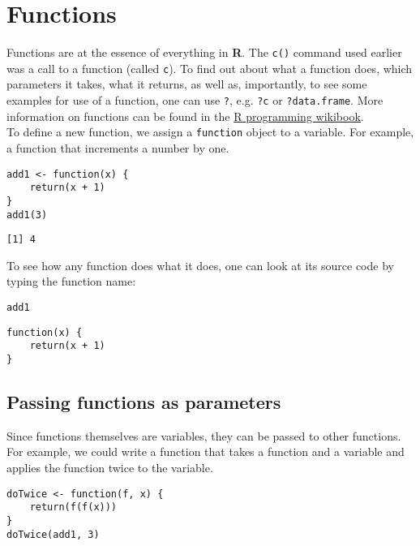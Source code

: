 \documentclass[11pt,a4paper]{article}
\begin{document}
\section{Functions}
\label{sec-3}
Functions are at the essence of everything in \textbf{R}. The \verb~c()~ command used earlier was a call to a function (called \verb~c~). To find out about what a function does, which parameters it takes, what it returns, as well as, importantly, to see some examples for use of a function, one can use \verb~?~, e.g. \verb~?c~ or \verb~?data.frame~. More information on functions can be found in the \href{http://en.wikibooks.org/wiki/R_Programming/Working_with_functions}{R programming wikibook}. \\

To define a new function, we assign a \verb~function~ object to a variable. For example, a function that increments a number by one. \\

\begin{verbatim}
add1 <- function(x) {
    return(x + 1)
}
add1(3)
\end{verbatim}

\begin{verbatim}
[1] 4
\end{verbatim}

To see how any function does what it does, one can look at its source code by typing the function name: \\

\begin{verbatim}
add1
\end{verbatim}

\begin{verbatim}
function(x) {
    return(x + 1)
}
\end{verbatim}

\subsection{Passing functions as parameters}
\label{sec-3-1}

Since functions themselves are variables, they can be passed to other functions. For example, we could write a function that takes a function and a variable and applies the function twice to the variable. \\

\begin{verbatim}
doTwice <- function(f, x) {
    return(f(f(x)))
}
doTwice(add1, 3)
\end{verbatim}
\end{document}
